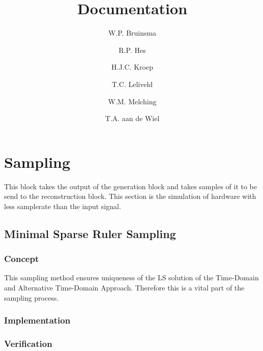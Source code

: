 \documentclass[report, oneside, a4paper, openany]{memoir}
\title{Documentation}
\author{W.P. Bruinsma \and R.P. Hes \and H.J.C. Kroep \and T.C. Leliveld \and W.M. Melching \and T.A. aan de Wiel}
\begin{document}
\chapter{Sampling}
This block takes the output of the generation block and takes samples of it to be send to the reconstruction block. 
This section is the simulation of hardware with less samplerate than the input signal.


\section{Minimal Sparse Ruler Sampling}
\subsection{Concept}
This sampling method ensures uniqueness of the LS solution of the Time-Domain and Alternative Time-Domain Approach. Therefore this is a vital part of the sampling process.

\subsection{Implementation}

\subsection{Verification}
\end{document}
